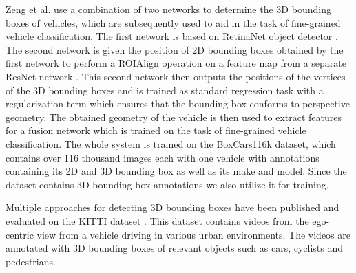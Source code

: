 \documentclass[twocolumn]{svjour3}          \smartqed  \usepackage{graphicx}
\begin{document}
Zeng et al. \cite{perspectivenet} use a combination of two networks to determine the 3D bounding boxes of vehicles, which are subsequently used to aid in the task of fine-grained vehicle classification. The first network is based on RetinaNet object detector \cite{RetinaNet}. The second network is given the position of 2D bounding boxes obtained by the first network to perform a ROIAlign operation \cite{MaskRCNN} on a feature map from a separate ResNet network \cite{resnet}. This second network then outputs the positions of the vertices of the 3D bounding boxes and is trained as standard regression task with a regularization term which ensures that the bounding box conforms to perspective geometry. The obtained geometry of the vehicle is then used to extract features for a fusion network which is trained on the task of fine-grained vehicle classification. The whole system is trained on the BoxCars116k \cite{boxcars} dataset, which contains over 116 thousand images each with one vehicle with annotations containing its 2D and 3D bounding box as well as its make and model. Since the dataset contains 3D bounding box annotations we also utilize it for training.

Multiple approaches for detecting 3D bounding boxes have been published and evaluated on the KITTI dataset \cite{KITTI}. This dataset contains videos from the ego-centric view from a vehicle driving in various urban environments. The videos are annotated with 3D bounding boxes of relevant objects such as cars, cyclists and pedestrians. 
\end{document}
